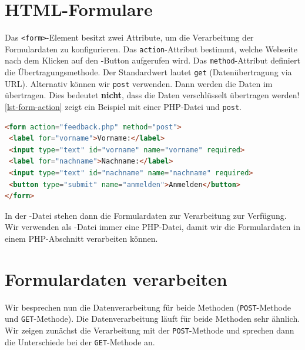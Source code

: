 
\formulareMitPhpVerarbeitenLernziele

\section{\ac{HTML}-Formulare}

Das \lstinline{<form>}-Element besitzt zwei Attribute, um die Verarbeitung der Formulardaten zu konfigurieren. Das \lstinline{action}-Attribut bestimmt, welche Webseite nach dem Klicken auf den -Button aufgerufen wird. Das \lstinline{method}-Attribut definiert die Übertragungsmethode. Der Standardwert lautet \lstinline{get} (Datenübertragung via \ac{URL}). Alternativ können wir \lstinline{post} verwenden. Dann werden die Daten im  übertragen. Dies bedeutet \textbf{nicht}, dass die Daten verschlüsselt übertragen werden! \autoref{lst-form-action} zeigt ein Beispiel mit einer \ac{PHP}-Datei und \texttt{post}.

\begin{lstlisting}[language=HTML, caption={Wenn wir auf den Button klicken, dann wird die Datei \texttt{feedback.php} aufgerufen.}, label={lst-form-action}]
<form action="feedback.php" method="post">
 <label for="vorname">Vorname:</label>
 <input type="text" id="vorname" name="vorname" required>
 <label for="nachname">Nachname:</label>
 <input type="text" id="nachname" name="nachname" required>
 <button type="submit" name="anmelden">Anmelden</button>
</form>
\end{lstlisting}

In der -Datei stehen dann die Formulardaten zur Verarbeitung zur Verfügung. Wir verwenden als -Datei immer eine \ac{PHP}-Datei, damit wir die Formulardaten in einem \ac{PHP}-Abschnitt verarbeiten können.

\section{Formulardaten verarbeiten}

Wir besprechen nun die Datenverarbeitung für beide Methoden (\texttt{POST}-Methode und \texttt{GET}-Methode). Die Datenverarbeitung läuft für beide Methoden sehr ähnlich. Wir zeigen zunächst die Verarbeitung mit der \texttt{POST}-Methode und sprechen dann die Unterschiede bei der \texttt{GET}-Methode an.

